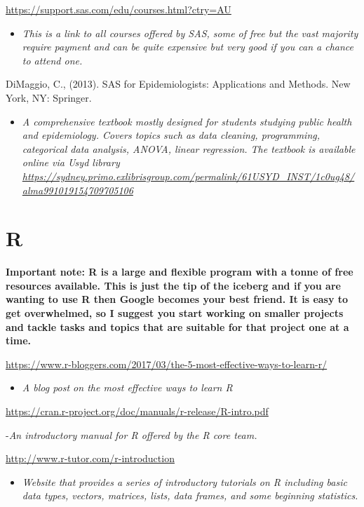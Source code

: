 \documentclass[
]{book}
\providecommand{\tightlist}{%
  \setlength{\itemsep}{0pt}\setlength{\parskip}{0pt}}
\begin{document}
\url{https://support.sas.com/edu/courses.html?ctry=AU}

\begin{itemize}
\tightlist
\item
  \emph{This is a link to all courses offered by SAS, some of free but the vast majority require payment and can be quite expensive but very good if you can a chance to attend one.}
\end{itemize}

DiMaggio, C., (2013). SAS for Epidemiologists: Applications and Methods. New York, NY: Springer.

\begin{itemize}
\tightlist
\item
  \emph{A comprehensive textbook mostly designed for students studying public health and epidemiology. Covers topics such as data cleaning, programming, categorical data analysis, ANOVA, linear regression. The textbook is available online via Usyd library \url{https://sydney.primo.exlibrisgroup.com/permalink/61USYD_INST/1c0ug48/alma991019154709705106}}
\end{itemize}

\hypertarget{r}{%
\section{R}\label{r}}

\textbf{Important note: R is a large and flexible program with a tonne of free resources available. This is just the tip of the iceberg and if you are wanting to use R then Google becomes your best friend. It is easy to get overwhelmed, so I suggest you start working on smaller projects and tackle tasks and topics that are suitable for that project one at a time. }

\url{https://www.r-bloggers.com/2017/03/the-5-most-effective-ways-to-learn-r/}

\begin{itemize}
\tightlist
\item
  \emph{A blog post on the most effective ways to learn R}
\end{itemize}

\url{https://cran.r-project.org/doc/manuals/r-release/R-intro.pdf}

-\emph{An introductory manual for R offered by the R core team.}

\url{http://www.r-tutor.com/r-introduction}

\begin{itemize}
\tightlist
\item
  \emph{Website that provides a series of introductory tutorials on R including basic data types, vectors, matrices, lists, data frames, and some beginning statistics.}
\end{itemize}
\end{document}
